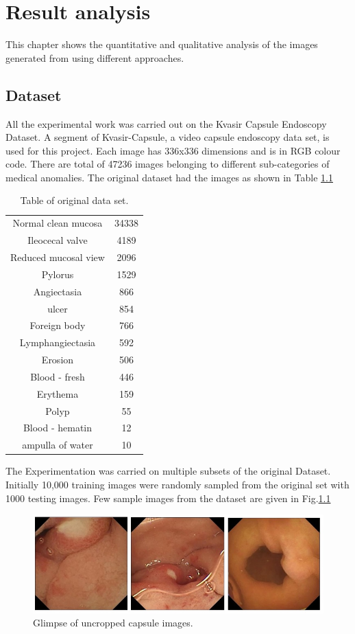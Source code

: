 \chapter{Result analysis}
This chapter shows the quantitative and qualitative analysis of the images generated from using different approaches.


\section{Dataset}
All the experimental work was carried out on the Kvasir Capsule Endoscopy Dataset\cite{data}. A segment of Kvasir-Capsule, a video capsule endoscopy data set, is used for this project.
Each image has 336x336 dimensions and is in RGB colour code. There are total of 47236 images belonging to different sub-categories of medical anomalies.
The original dataset had the images as shown in Table \ref{Table:4.1}
\begin{table}[h!]
\centering
\caption{Table of original data set.}
\begin{tabular}{ |c|c| }
\hline
 Normal clean mucosa & 34338 \\
 Ileocecal valve & 4189 \\
 Reduced mucosal view & 2096 \\
 Pylorus    &    1529 \\
 Angiectasia         &     866 \\
 ulcer               &     854 \\
 Foreign body        &     766\\    
 Lymphangiectasia    &     592 \\
 Erosion             &     506 \\
 Blood - fresh       &     446 \\
 Erythema            &      159 \\
 Polyp               &      55 \\
 Blood - hematin     &       12 \\
 ampulla of water    &        10 \\
\hline
\end{tabular}
\label{Table:4.1}
\end{table}
\newline
The Experimentation was carried on multiple subsets of the original Dataset.
Initially 10,000 training images were randomly sampled from the original set with 1000 testing images. Few sample images from the dataset are given in Fig.\ref{fig:label4.1}
\begin{figure}[h]
    \centering
    \includegraphics[totalheight=1.5in]{Chapter4/Fig4.1.jpg}
    \caption[Glimpse of uncropped capsule images]{Glimpse of uncropped capsule images.\cite{data}}
    \label{fig:label4.1}
\end{figure}
